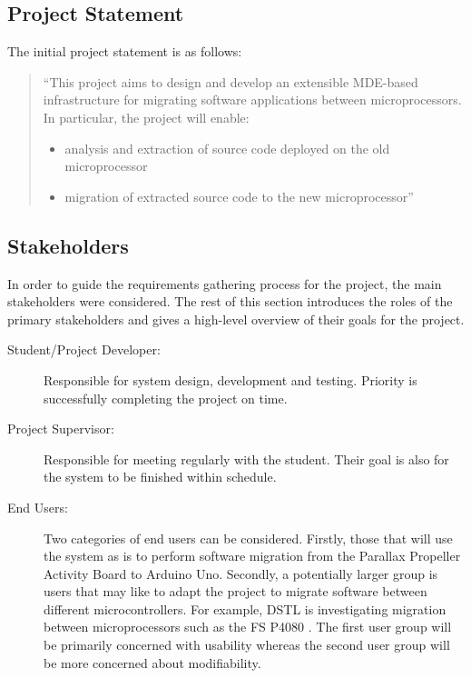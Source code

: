 \documentclass{UoYCSproject}
\begin{document}
\subsection{Project Statement} \label{proj_stmt}
The initial project statement is as follows: 
\begin{quote}
``This project aims to design and develop an extensible MDE-based infrastructure for migrating software applications between microprocessors. In particular, the project will enable:
\begin{itemize}
\item analysis and extraction of source code deployed on the old microprocessor
\item migration of extracted source code to the new microprocessor''
\end{itemize}
\end{quote}

\subsection{Stakeholders} \label{stakeholders}
In order to guide the requirements gathering process for the project, the main stakeholders were considered. The rest of this section introduces the roles of the primary stakeholders and gives a high-level overview of their goals for the project.

\begin{description}
\item[Student/Project Developer:] Responsible for system design, development and testing. Priority is successfully completing the project on time.

\item[Project Supervisor:] Responsible for meeting regularly with the student. Their goal is also for the system to be finished within schedule.

\item[End Users:] Two categories of end users can be considered. Firstly, those that will use the system as is to perform software migration from the Parallax Propeller Activity Board to Arduino Uno. Secondly, a potentially larger group is users that may like to adapt the project to migrate software between different microcontrollers. For example, DSTL is investigating migration between microprocessors such as the FS P4080 \parencite{gerasimou2017technical}. The first user group will be primarily concerned with usability whereas the second user group will be more concerned about modifiability.
\end{description}
\end{document}

